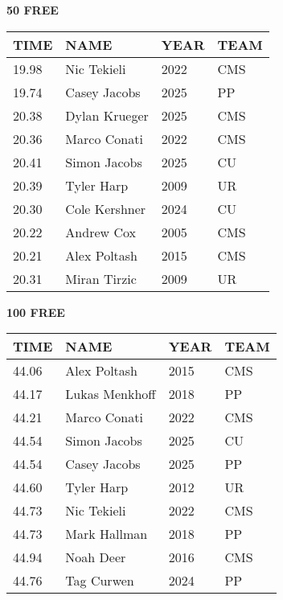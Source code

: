 \begin{minipage}[t]{0.48\textwidth}
\centering
\textbf{50 FREE}\\[0.05cm]
\begin{tabular}{@{}p{1.8cm}p{2.8cm}p{1.2cm}p{1.4cm}@{}}
\hline
\textbf{TIME} & \textbf{NAME} & \textbf{YEAR} & \textbf{TEAM} \\
\hline
19.98 & Nic Tekieli & 2022 & CMS \\
19.74 & Casey Jacobs & 2025 & PP \\
20.38 & Dylan Krueger & 2025 & CMS \\
20.36 & Marco Conati & 2022 & CMS \\
20.41 & Simon Jacobs & 2025 & CU \\
20.39 & Tyler Harp & 2009 & UR \\
20.30 & Cole Kershner & 2024 & CU \\
20.22 & Andrew Cox & 2005 & CMS \\
20.21 & Alex Poltash & 2015 & CMS \\
20.31 & Miran Tirzic & 2009 & UR \\
\hline
\end{tabular}
\end{minipage}\hfill
\begin{minipage}[t]{0.48\textwidth}
\centering
\textbf{100 FREE}\\[0.05cm]
\begin{tabular}{@{}p{1.8cm}p{2.8cm}p{1.2cm}p{1.4cm}@{}}
\hline
\textbf{TIME} & \textbf{NAME} & \textbf{YEAR} & \textbf{TEAM} \\
\hline
44.06 & Alex Poltash & 2015 & CMS \\
44.17 & Lukas Menkhoff & 2018 & PP \\
44.21 & Marco Conati & 2022 & CMS \\
44.54 & Simon Jacobs & 2025 & CU \\
44.54 & Casey Jacobs & 2025 & PP \\
44.60 & Tyler Harp & 2012 & UR \\
44.73 & Nic Tekieli & 2022 & CMS \\
44.73 & Mark Hallman & 2018 & PP \\
44.94 & Noah Deer & 2016 & CMS \\
44.76 & Tag Curwen & 2024 & PP \\
\hline
\end{tabular}
\end{minipage}

\vspace{0.4cm}

